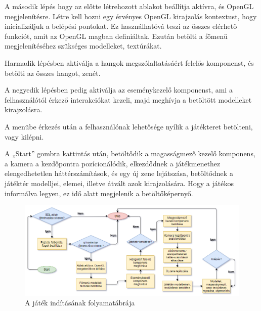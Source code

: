 A második lépés hogy az előtte létrehozott ablakot beállítja aktívra, és OpenGL megjelenítésre. Létre kell hozni egy érvényes OpenGL  kirajzolás kontextust, hogy inicializáljuk a belépési pontokat. Ez használhatóvá teszi az összes elérhető funkciót, amit az OpenGL magban definiáltak. Ezután betölti a főmenü megjelenítéséhez szükséges modelleket, textúrákat.

Harmadik lépésben aktiválja a hangok megszólaltatásáért felelős komponenst, és betölti az összes hangot, zenét.

A negyedik lépésben pedig aktiválja az eseménykezelő komponenst, ami a felhasználótól érkező interakciókat kezeli, majd meghívja a betöltött modelleket kirajzolásra.

A menübe érkezés után a felhasználónak lehetősége nyílik a játékteret betölteni, vagy kilépni. 

A „Start” gombra kattintás után, betöltődik a magasságmező kezelő komponens, a kamera a kezdőpontra pozícionálódik, elkezdődnek a játékmenethez elengedhetetlen háttérszámítások, és egy új zene lejátszása, betöltődnek a játéktér modelljei, elemei, illetve átvált azok kirajzolására. Hogy a játékos informálva legyen, ez idő alatt megjelenik a betöltőképernyő.

\begin{figure}[h]
\centering
\includegraphics[scale=0.46]{kepek/starting_diagram.png}
\caption{A játék indításának folyamatábrája}
\label{fig:starting}
\end{figure}